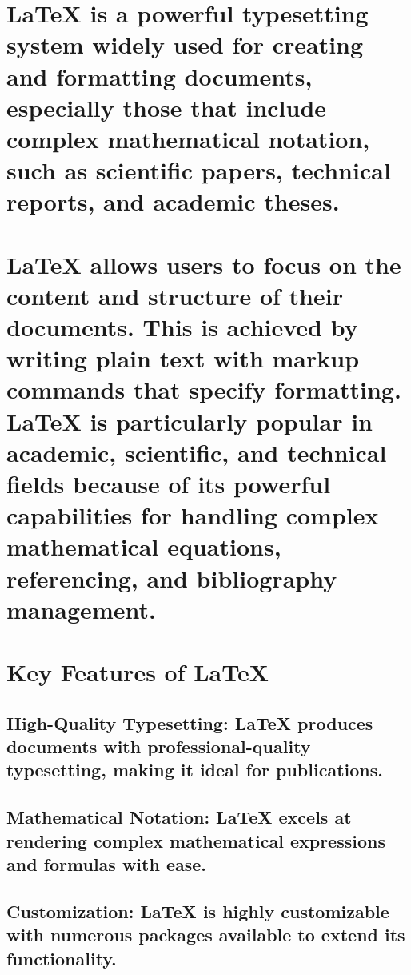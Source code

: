 \documentclass{book}
\begin{document}
	\pagestyle{fancy}
	\fancyhead{}
	\fancyfoot{}
	\fancyfoot[LE,RO]{\thepage}
	\section{LaTeX is a powerful typesetting system widely used for creating and formatting documents, especially those that include complex mathematical notation, such as scientific papers, technical reports, and academic theses.}

	\section{LaTeX allows users to focus on the content and structure of their documents. This is achieved by writing plain text with markup commands that specify formatting. LaTeX is particularly popular in academic, scientific, and technical fields because of its powerful capabilities for handling complex mathematical equations, referencing, and bibliography management.}
		
	\section{Key Features of LaTeX}
	
	\subsection{High-Quality Typesetting: LaTeX produces documents with professional-quality typesetting, making it ideal for publications.}
	
	\subsection{Mathematical Notation: LaTeX excels at rendering complex mathematical expressions and formulas with ease.}
	
	\subsection{Customization: LaTeX is highly customizable with numerous packages available to extend its functionality.}
	
\end{document}

